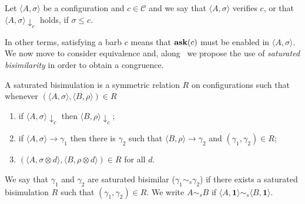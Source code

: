 \documentclass{llncs}
\newcommand{\ask}{{\bf ask}}
\def\monid{{\mathbf 0}}
\def\monid{\mathbf{1}}
\begin{document}
\begin{definition} [Barbs]
Let $\langle A, \sigma \rangle$ be a configuration and $c \in \mathcal{C}$
and we say that $\langle A, \sigma \rangle$ verifies $c$, or that $\langle A, \sigma \rangle \downarrow_c$ holds, if  $\sigma \leq c$.
\end{definition}

In other terms, satisfying a barb $c$ means that $\hbox{\ask}(c)$ must be enabled in $\langle A, \sigma \rangle$.
%
We now move to consider equivalence and, %
along~\cite{pippo}
we propose the use of \emph{saturated bisimilarity}
in order to obtain a congruence.
%

\begin{definition}\label{def:strongsb} A saturated bisimulation is a symmetric relation $R$ on configurations such that whenever
$( \langle A, \sigma \rangle,\langle B, \rho \rangle) \in R$
\begin{enumerate}
\item if $\langle A, \sigma \rangle \downarrow_c$ then $\langle B, \rho \rangle \downarrow_c$;
\item if $\langle A, \sigma \rangle \to \gamma_1$ then there is $\gamma_2$ such that $\langle B, \rho \rangle \to \gamma_2$ and $(\gamma_1, \gamma_2) \in R$;
\item $(\langle A,\sigma \otimes d\rangle, \langle B,\rho \otimes d \rangle) \in R$ for  all $d$.
\end{enumerate}
We say that $\gamma_1$ and $\gamma_2$ are  saturated bisimilar ($\gamma_1  \sim_{\mathit{s}} \gamma_2$) if there exists a  saturated  bisimulation $R$ such that $(\gamma_1 , \gamma_2 ) \in R$. We write $A \sim_{\mathit{s}} B$ if $\langle A, \monid \rangle \sim_{\mathit{s}} \langle B, \monid \rangle$.
\end{definition}
\end{document}
